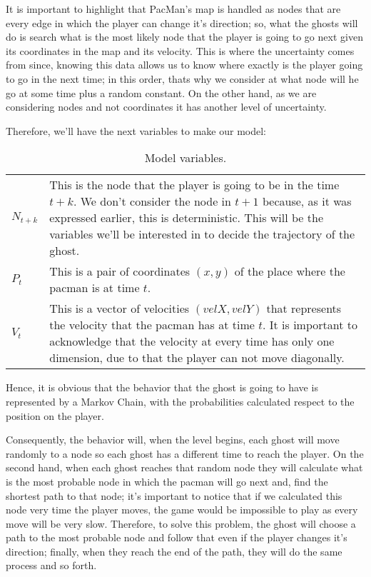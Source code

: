 It is important to highlight that PacMan's map is handled as nodes that are every edge in which the player can change it's direction; so, what the ghosts will do is search what is the most likely node that the player is going to go next given its coordinates in the map and its velocity. This is where the uncertainty comes from since, knowing this data allows us to know where exactly is the player going to go in the next time; in this order, thats why we consider at what node will he go at some time plus a random constant. On the other hand, as we are considering nodes and not coordinates  it has another level of uncertainty.

Therefore, we'll have the next variables to make our model:

\begin{table}[H]
\centering

\begin{tabular}{l p{8cm}}
\hline
 $N_{t+k}$ & This is the node that the player is going to be in the time $t+k$.  We don't consider the node in $t+1$ because, as it was expressed earlier, this is deterministic. This will be the variables we'll be interested in to decide the trajectory of the ghost.\\
 $P_t$ &  This is a pair of coordinates $(x,y)$ of the place where the pacman is at time $t$.\\
 $V_t$ &  This is a vector of velocities $(velX,velY)$ that represents the velocity that the pacman has at time $t$. It is important to acknowledge that the velocity at every time has only one dimension, due to that the player can not move diagonally.\\ \hline
\end{tabular}
\caption{Model variables.}
\end{table}



Hence, it is obvious that the behavior that the ghost is going to have is represented by a Markov Chain, with the probabilities calculated respect to the position on the player.

Consequently, the behavior will, when the level begins, each ghost will move randomly to a node so each ghost has a different time to reach the player. On the second hand, when each ghost reaches that random node they will calculate what is the most probable node in which the pacman will go next and, find the shortest path to that node; it's important to notice that if we calculated this node very time the player moves, the game would be impossible to play as every move will be very slow. Therefore, to solve this problem, the ghost will choose a path to the most probable node and follow that even if the player changes it's direction; finally, when they reach the end of the path, they will do the same process and so forth.

